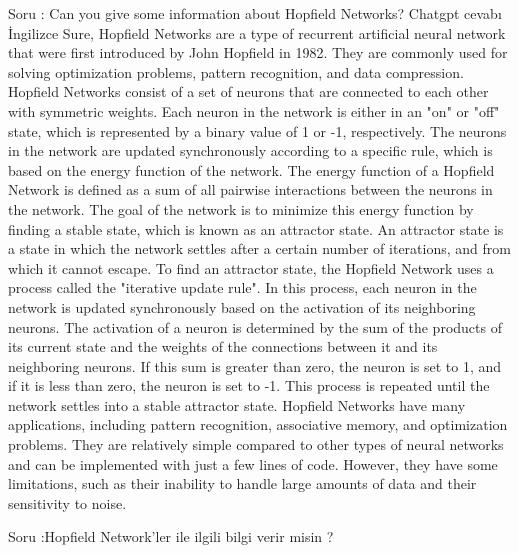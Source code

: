 \documentclass[11pt]{article}
\begin{document}
Soru : Can you give some information about Hopfield Networks?
Chatgpt cevabı İngilizce
Sure, Hopfield Networks are a type of recurrent artificial neural network that were first introduced by John Hopfield in 1982. They are commonly used for solving optimization problems, pattern recognition, and data compression.
Hopfield Networks consist of a set of neurons that are connected to each other with symmetric weights. Each neuron in the network is either in an "on" or "off" state, which is represented by a binary value of 1 or -1, respectively. The neurons in the network are updated synchronously according to a specific rule, which is based on the energy function of the network.
The energy function of a Hopfield Network is defined as a sum of all pairwise interactions between the neurons in the network. The goal of the network is to minimize this energy function by finding a stable state, which is known as an attractor state. An attractor state is a state in which the network settles after a certain number of iterations, and from which it cannot escape.
To find an attractor state, the Hopfield Network uses a process called the "iterative update rule". In this process, each neuron in the network is updated synchronously based on the activation of its neighboring neurons. The activation of a neuron is determined by the sum of the products of its current state and the weights of the connections between it and its neighboring neurons. If this sum is greater than zero, the neuron is set to 1, and if it is less than zero, the neuron is set to -1. This process is repeated until the network settles into a stable attractor state.
Hopfield Networks have many applications, including pattern recognition, associative memory, and optimization problems. They are relatively simple compared to other types of neural networks and can be implemented with just a few lines of code. However, they have some limitations, such as their inability to handle large amounts of data and their sensitivity to noise.

Soru :Hopfield Network’ler ile ilgili bilgi verir misin ?
\end{document}
